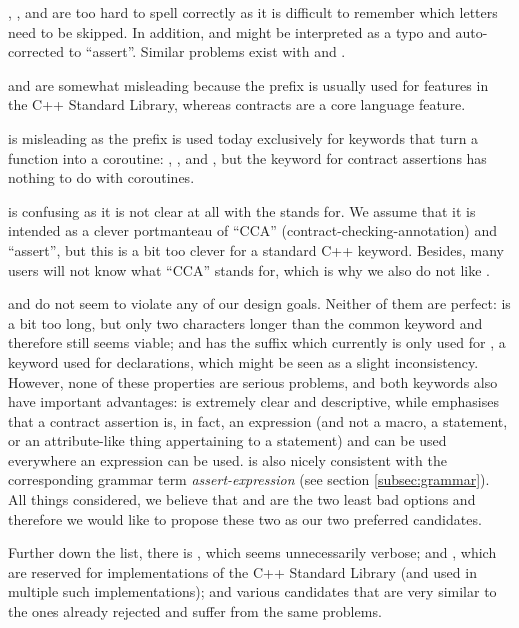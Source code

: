 , , and  are too hard to spell correctly as it is difficult to remember which letters need to be skipped. In addition,  and  might be interpreted as a typo and auto-corrected to ``assert''. Similar problems exist with  and .

 and  are somewhat misleading because the prefix  is usually used for features in the C++ Standard Library, whereas contracts are a core language feature.

 is misleading as the prefix  is used today exclusively for keywords that turn a function into a coroutine: , , and , but the keyword for contract assertions has nothing to do with coroutines.

 is confusing as it is not clear at all with the  stands for. We assume that it is intended as a clever portmanteau of ``CCA'' (contract-checking-annotation) and ``assert'', but this is a bit too clever for a standard C++ keyword. Besides, many users will not know what ``CCA'' stands for, which is why we also do not like .

 and  do not seem to violate any of our design goals. Neither of them are perfect:  is a bit too long, but only two characters longer than the common keyword  and therefore still seems viable; and  has the  suffix which currently is only used for , a keyword used for declarations, which might be seen as a slight inconsistency. However, none of these properties are serious problems, and both keywords also have important advantages: \mbox{} is extremely clear and descriptive, while  emphasises that a contract assertion is, in fact, an expression (and not a macro, a statement, or an attribute-like thing appertaining to a statement) and can be used everywhere an expression can be used.  is also nicely consistent with the corresponding grammar term \emph{assert-expression} (see section \ref{subsec:grammar}). All things considered, we believe that  and  are the two least bad options and therefore we would like to propose these two as our two preferred candidates.

Further down the list, there is , which seems unnecessarily verbose;  and , which are reserved for implementations of the C++ Standard Library (and used in multiple such implementations); and various candidates that are very similar to the ones already rejected and suffer from the same problems.

